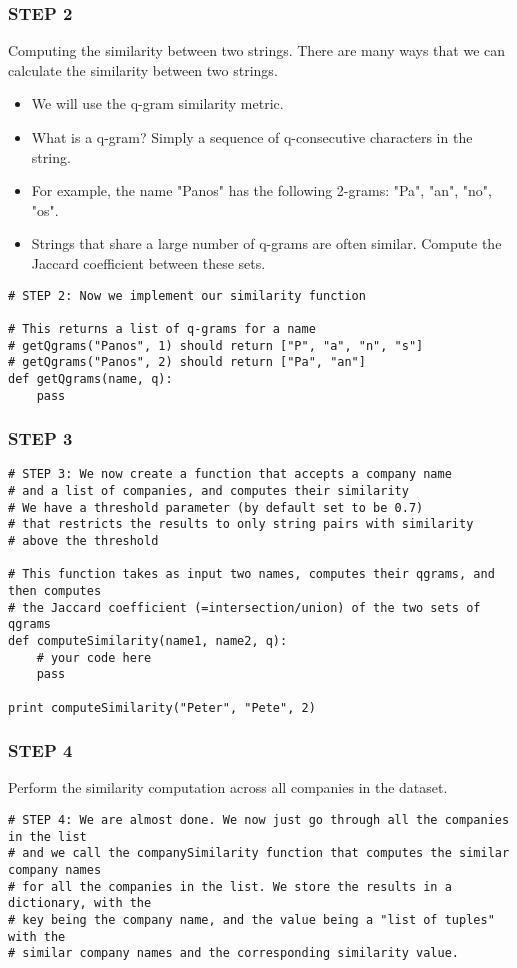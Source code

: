 \begin{frame}[fragile]\frametitle{STEP 2}
Computing the similarity between two strings. There are many ways that we can calculate the similarity between two strings. 
  \begin{itemize}
  \item We will use the q-gram similarity metric. 
  \item What is a q-gram? Simply a sequence of q-consecutive characters in the string. 
  \item For example, the name "Panos" has the following 2-grams: "Pa", "an", "no", "os". 
  \item Strings that share a large number of q-grams are often similar. Compute the Jaccard coefficient between these sets. 
  \end{itemize}
  \begin{lstlisting}
# STEP 2: Now we implement our similarity function

# This returns a list of q-grams for a name
# getQgrams("Panos", 1) should return ["P", "a", "n", "s"]
# getQgrams("Panos", 2) should return ["Pa", "an"]
def getQgrams(name, q):
    pass
  \end{lstlisting}
\end{frame}

\begin{frame}[fragile]\frametitle{STEP 3}
  \begin{lstlisting}
# STEP 3: We now create a function that accepts a company name
# and a list of companies, and computes their similarity
# We have a threshold parameter (by default set to be 0.7)
# that restricts the results to only string pairs with similarity
# above the threshold

# This function takes as input two names, computes their qgrams, and then computes
# the Jaccard coefficient (=intersection/union) of the two sets of qgrams
def computeSimilarity(name1, name2, q):
    # your code here
    pass
    
print computeSimilarity("Peter", "Pete", 2)
  \end{lstlisting}
\end{frame}

\begin{frame}[fragile]\frametitle{STEP 4}
Perform the similarity computation across all companies in the dataset.
  \begin{lstlisting}
# STEP 4: We are almost done. We now just go through all the companies in the list
# and we call the companySimilarity function that computes the similar company names
# for all the companies in the list. We store the results in a dictionary, with the 
# key being the company name, and the value being a "list of tuples" with the 
# similar company names and the corresponding similarity value.

  \end{lstlisting}
\end{frame}
